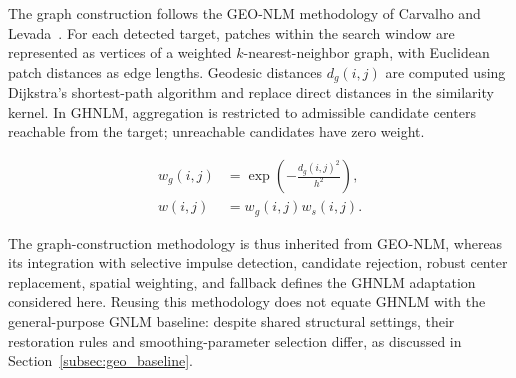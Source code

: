 \documentclass[pdflatex,iicol,sn-mathphys-num]{sn-jnl}
\newif\ifshowportuguese
\newcommand{\pt}[1]{\ifshowportuguese\par\begingroup\small\color{blue!55!black}\noindent\textbf{PT: }#1\par\endgroup\fi}
\begin{document}
The graph construction follows the GEO-NLM methodology of Carvalho and Levada~\cite{carvalho2026geo}. For each detected target, patches within the search window are represented as vertices of a weighted $k$-nearest-neighbor graph, with Euclidean patch distances as edge lengths. Geodesic distances $d_g(i,j)$ are computed using Dijkstra's shortest-path algorithm and replace direct distances in the similarity kernel. In GHNLM, aggregation is restricted to admissible candidate centers reachable from the target; unreachable candidates have zero weight.
\pt{A construção do grafo segue a metodologia do GEO-NLM de Carvalho e Levada~\cite{carvalho2026geo}. Para cada alvo detectado, os patches da janela de busca são representados como vértices de um grafo ponderado de $k$ vizinhos mais próximos, com distâncias Euclidianas entre patches como comprimentos das arestas. As distâncias geodésicas $d_g(i,j)$ são calculadas pelo algoritmo de caminhos mínimos de Dijkstra e substituem as distâncias diretas no kernel de similaridade. No GHNLM, a agregação é restrita a centros de candidatos admissíveis alcançáveis a partir do alvo; candidatos inalcançáveis têm peso zero.}
\begin{equation}
\begin{aligned}
w_g(i,j)&=\exp\left(-\frac{d_g(i,j)^2}{h^2}\right),\\
w(i,j)&=w_g(i,j)w_s(i,j).
\end{aligned}
\label{eq:geodesic_weight}
\end{equation}

The graph-construction methodology is thus inherited from GEO-NLM, whereas its integration with selective impulse detection, candidate rejection, robust center replacement, spatial weighting, and fallback defines the GHNLM adaptation considered here. Reusing this methodology does not equate GHNLM with the general-purpose GNLM baseline: despite shared structural settings, their restoration rules and smoothing-parameter selection differ, as discussed in Section~\ref{subsec:geo_baseline}.
\pt{A metodologia de construção do grafo é, portanto, herdada do GEO-NLM, enquanto sua integração com detecção seletiva de impulsos, rejeição de candidatos, substituição robusta do centro, ponderação espacial e fallback define a adaptação GHNLM considerada aqui. Reutilizar essa metodologia não torna o GHNLM equivalente ao baseline GNLM de propósito geral: apesar das configurações estruturais comuns, suas regras de restauração e seleção do parâmetro de suavização diferem, conforme discutido na Seção~\ref{subsec:geo_baseline}.}
\end{document}
